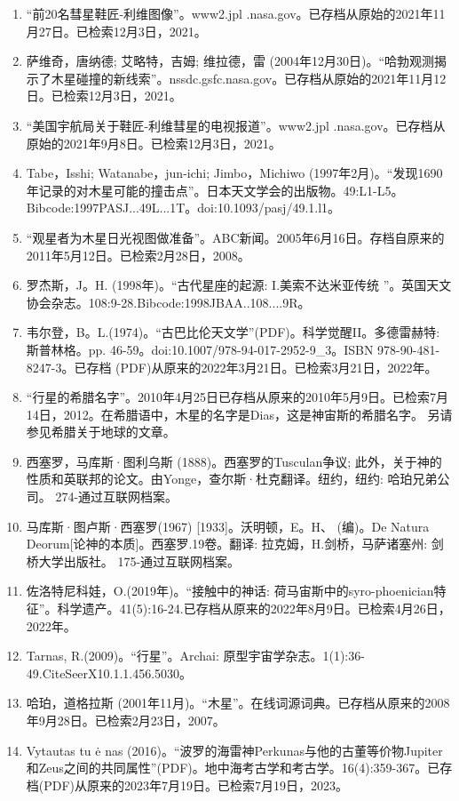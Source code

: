 \begin{enumerate}
\item “前20名彗星鞋匠-利维图像”。www2.jpl .nasa.gov。已存档从原始的2021年11月27日。已检索12月3日，2021。
\item 萨维奇，唐纳德; 艾略特，吉姆; 维拉德，雷 (2004年12月30日)。“哈勃观测揭示了木星碰撞的新线索”。nssdc.gsfc.nasa.gov。已存档从原始的2021年11月12日。已检索12月3日，2021。
\item “美国宇航局关于鞋匠-利维彗星的电视报道”。www2.jpl .nasa.gov。已存档从原始的2021年9月8日。已检索12月3日，2021。
\item Tabe，Isshi; Watanabe，jun-ichi; Jimbo，Michiwo (1997年2月)。“发现1690年记录的对木星可能的撞击点”。日本天文学会的出版物。49:L1-L5。Bibcode:1997PASJ...49L...1T。doi:10.1093/pasj/49.1.l1。
\item “观星者为木星日光视图做准备”。ABC新闻。2005年6月16日。存档自原来的2011年5月12日。已检索2月28日，2008。
\item 罗杰斯，J。H. (1998年)。“古代星座的起源: I.美索不达米亚传统 ”。英国天文协会杂志。108:9-28.Bibcode:1998JBAA..108....9R。
\item 韦尔登，B。L.(1974)。“古巴比伦天文学”(PDF)。科学觉醒II。多德雷赫特: 斯普林格。pp. 46-59。doi:10.1007/978-94-017-2952-9_3。ISBN  978-90-481-8247-3。已存档 (PDF)从原来的2022年3月21日。已检索3月21日，2022年。
\item “行星的希腊名字”。2010年4月25日已存档从原来的2010年5月9日。已检索7月14日，2012。在希腊语中，木星的名字是Dias，这是神宙斯的希腊名字。 另请参见希腊关于地球的文章。
\item 西塞罗，马库斯·图利乌斯 (1888)。西塞罗的Tusculan争议; 此外，关于神的性质和英联邦的论文。由Yonge，查尔斯·杜克翻译。纽约，纽约: 哈珀兄弟公司。 274-通过互联网档案。
\item 马库斯·图卢斯·西塞罗(1967) [1933]。沃明顿，E。H、 (编)。De Natura Deorum[论神的本质]。西塞罗.19卷。翻译: 拉克姆，H.剑桥，马萨诸塞州: 剑桥大学出版社。 175-通过互联网档案。
\item 佐洛特尼科娃，O.(2019年)。“接触中的神话: 荷马宙斯中的syro-phoenician特征”。科学遗产。41(5):16-24.已存档从原来的2022年8月9日。已检索4月26日，2022年。
\item Tarnas, R.(2009)。“行星”。Archai: 原型宇宙学杂志。1(1):36-49.CiteSeerX10.1.1.456.5030。 
\item 哈珀，道格拉斯 (2001年11月)。“木星”。在线词源词典。已存档从原来的2008年9月28日。已检索2月23日，2007。
\item Vytautas tu ė nas (2016)。“波罗的海雷神Perkunas与他的古董等价物Jupiter和Zeus之间的共同属性”(PDF)。地中海考古学和考古学。16(4):359-367。已存档(PDF)从原来的2023年7月19日。已检索7月19日，2023。

\end{enumerate}
